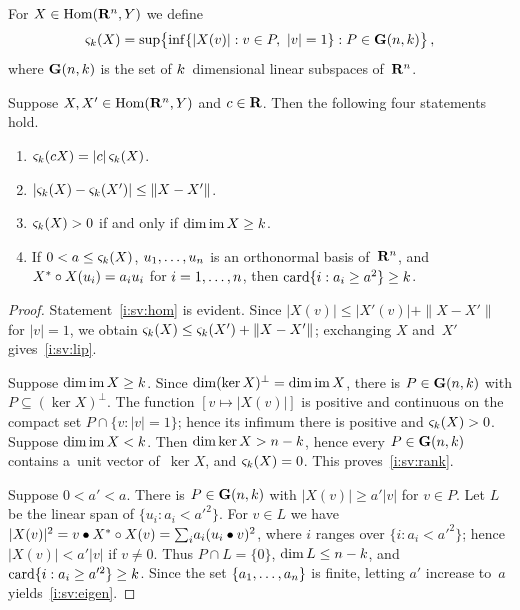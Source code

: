 \documentclass[a4paper,twoside,leqno]{article}
\newcommand{\sv}[1]{\varsigma_{#1}}        %
\begin{document}
\begin{definition}
    \label{def:sv}
    For $X \in \operatorname{Hom}(\mathbf{R}^{n},Y)$ we define
    \begin{displaymath}
        \sv{\vdim}(X) = \sup \bigl\{ \inf \{ |X(v)| : v \in P,\ |v| = 1 \} : P \in
        \grass{\adim}{\vdim} \bigr\} \,,
    \end{displaymath}
    where $\mathbf{G}(n,k)$ is the set of $k$~dimensional linear subspaces
    of~$\mathbf{R}^{n}$.
\end{definition}

\begin{lemma}
    \label{lem:sv}
    Suppose $X, X' \in \operatorname{Hom}(\mathbf{R}^{n},Y)$ and $c \in \mathbf{R}$. Then the following four statements
    hold.
    \begin{enumerate}
        \item \label{i:sv:hom} $\sv{\vdim}(cX) = |c| \, \sv{\vdim}(X)$.
        \item \label{i:sv:lip} $|\sv{\vdim}(X) - \sv{\vdim}(X')| \le \|X - X'\|$.
        \item \label{i:sv:rank} $\sv{\vdim}(X) > 0$ if and only if $\dim \operatorname{im} X \ge k$.
        \item \label{i:sv:eigen} If $0 < a \le \sv{\vdim}(X)$, $u_1, \ldots, u_{n}$ is an
        orthonormal basis of~$\mathbf{R}^{n}$, and $X^{*} \circ X (u_i) = a_i u_i$ for $i = 1,
        \ldots, n$, then $\operatorname{card} \{ i : a_i \ge a^2 \} \ge k$.
    \end{enumerate}
\end{lemma}

\begin{proof}
    Statement~\ref{i:sv:hom} is evident. Since $|X(v)| \le |X'(v)| + \|X - X'\|$ for $|v| = 1$, we
    obtain $\sv{\vdim}(X) \le \sv{\vdim}(X') + \|X - X'\|$; exchanging $X$ and~$X'$
    gives~\ref{i:sv:lip}.

    Suppose $\dim \operatorname{im} X \ge k$. Since $\dim (\ker X)^\perp = \dim \operatorname{im} X$, there is $P \in
    \mathbf{G}(n,k)$ with $P \subseteq (\ker X)^\perp$. The function $[v \mapsto |X(v)|]$ is
    positive and continuous on the compact set $P \cap \{ v : |v| = 1 \}$; hence its infimum there
    is positive and $\sv{\vdim}(X) > 0$. Suppose $\dim \operatorname{im} X < k$. Then $\dim \ker X > n -
    k$, hence every $P \in \mathbf{G}(n,k)$ contains a~unit vector of~$\ker X$, and
    $\sv{\vdim}(X) = 0$. This proves~\ref{i:sv:rank}.

    Suppose $0 < a' < a$. There is $P \in \mathbf{G}(n,k)$ with $|X(v)| \ge a' |v|$ for $v \in
    P$. Let $L$ be the linear span of $\{ u_i : a_i < a'^2 \}$. For $v \in L$ we have $|X(v)|^2 =
    v \bullet X^{*} \circ X(v) = {\textstyle\sum_{i}^{}} a_i (u_i \bullet v)^2$, where $i$ ranges over
    $\{ i : a_i < a'^2 \}$; hence $|X(v)| < a' |v|$ if $v \ne 0$. Thus $P \cap L = \{0\}$, $\dim L
    \le n - k$, and $\operatorname{card} \{ i : a_i \ge a'^2 \} \ge k$. Since the set $\{ a_1,
    \ldots, a_{n} \}$ is finite, letting $a'$ increase to~$a$ yields~\ref{i:sv:eigen}.
\end{proof}
\end{document}
